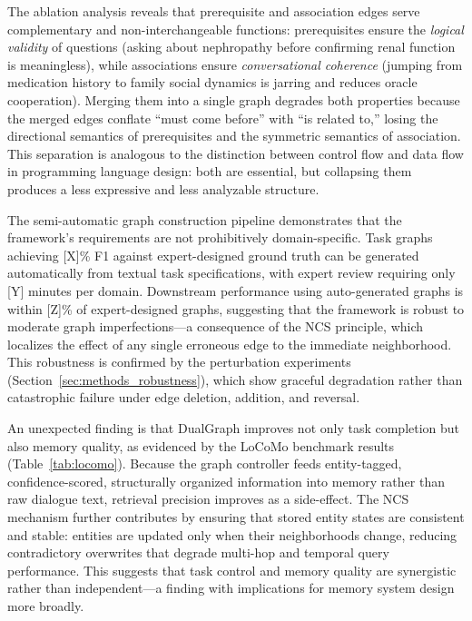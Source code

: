 \documentclass[11pt,a4paper]{article}
\begin{document}
The ablation analysis reveals that prerequisite and association edges serve
complementary and non-interchangeable functions: prerequisites ensure the
\emph{logical validity} of questions (asking about nephropathy before
confirming renal function is meaningless), while associations ensure
\emph{conversational coherence} (jumping from medication history to family
social dynamics is jarring and reduces oracle cooperation). Merging them
into a single graph degrades both properties because the merged edges
conflate ``must come before'' with ``is related to,'' losing the directional
semantics of prerequisites and the symmetric semantics of association.
This separation is analogous to the distinction between control flow and
data flow in programming language design: both are essential, but collapsing
them produces a less expressive and less analyzable structure.

The semi-automatic graph construction pipeline demonstrates that the
framework's requirements are not prohibitively domain-specific. Task graphs
achieving [X]\% F1 against expert-designed ground truth can be generated
automatically from textual task specifications, with expert review requiring
only [Y] minutes per domain. Downstream performance using auto-generated
graphs is within [Z]\% of expert-designed graphs, suggesting that the
framework is robust to moderate graph imperfections---a consequence of the
NCS principle, which localizes the effect of any single erroneous edge to
the immediate neighborhood. This robustness is confirmed by the
perturbation experiments (Section~\ref{sec:methods_robustness}), which
show graceful degradation rather than catastrophic failure under edge
deletion, addition, and reversal.

An unexpected finding is that DualGraph improves not only task completion
but also memory quality, as evidenced by the LoCoMo benchmark results
(Table~\ref{tab:locomo}). Because the graph controller feeds
entity-tagged, confidence-scored, structurally organized information into
memory rather than raw dialogue text, retrieval precision improves as a
side-effect. The NCS mechanism further contributes by ensuring that stored
entity states are consistent and stable: entities are updated only when
their neighborhoods change, reducing contradictory overwrites that degrade
multi-hop and temporal query performance. This suggests that task control
and memory quality are synergistic rather than independent---a finding
with implications for memory system design more broadly.
\end{document}
